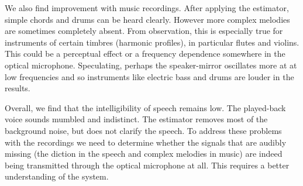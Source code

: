 \documentclass[paper-main.tex]{subfiles}
\begin{document}
We also find improvement with music recordings.
After applying the estimator, simple chords and drums can be heard clearly. 
However more complex melodies are sometimes completely absent. 
From observation, this is especially true for instruments of certain timbres (harmonic profiles), in particular flutes and violins.
This could be a perceptual effect or a frequency dependence somewhere in the optical microphone. 
Speculating, perhaps the speaker-mirror oscillates more at at low frequencies and so instruments like electric bass and drums are louder in the results.


Overall, we find that the intelligibility of speech remains low. 
The played-back voice sounds mumbled and indistinct. 
The estimator removes most of the background noise, but does not clarify the speech. 
To address these problems with the recordings we need to determine whether the signals that are audibly missing (the diction in the speech and complex melodies in music) are indeed being transmitted through the optical microphone at all. 
This requires a better understanding of the system.
\end{document}
